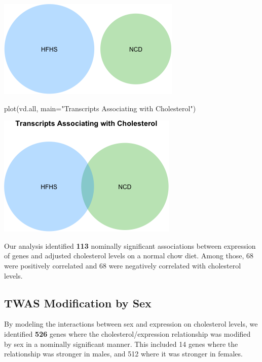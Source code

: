 \documentclass[
]{article}
\newenvironment{Shaded}{\begin{snugshade}}{\end{snugshade}}
\newcommand{\AttributeTok}[1]{\textcolor[rgb]{0.77,0.63,0.00}{#1}}
\newcommand{\FunctionTok}[1]{\textcolor[rgb]{0.00,0.00,0.00}{#1}}
\newcommand{\NormalTok}[1]{#1}
\newcommand{\StringTok}[1]{\textcolor[rgb]{0.31,0.60,0.02}{#1}}
\begin{document}
\includegraphics{figures/cholesterol-twas-hf-2.png}

\begin{Shaded}
\begin{Highlighting}[]
\FunctionTok{plot}\NormalTok{(vd.all, }\AttributeTok{main=}\StringTok{"Transcripts Associating with Cholesterol"}\NormalTok{)}
\end{Highlighting}
\end{Shaded}

\includegraphics{figures/cholesterol-twas-hf-3.png}

Our analysis identified \textbf{113} nominally significant associations
between expression of genes and adjusted cholesterol levels on a normal
chow diet. Among those, 68 were positively correlated and 68 were
negatively correlated with cholesterol levels.

\hypertarget{twas-modification-by-sex}{%
\subsection{TWAS Modification by Sex}\label{twas-modification-by-sex}}

By modeling the interactions between sex and expression on cholesterol
levels, we identified \textbf{526} genes where the
cholesterol/expression relationship was modified by sex in a nominally
significant manner. This included 14 genes where the relationship was
stronger in males, and 512 where it was stronger in females.
\end{document}
